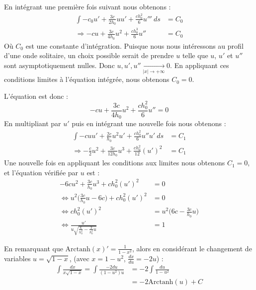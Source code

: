 \vspace{1em}

En intégrant une première fois suivant nous obtenons : 
\begin{equation*}
\begin{split}
    \int -c_0u' + \frac{3c}{2h_0}uu' + \frac{ch_0^2}{6}u''' \ ds &= C_0 \\
    \Rightarrow -cu + \frac{3c}{4h_0}u^2 + \frac{ch_0^3}{6}u'' &= C_0
\end{split}
\end{equation*}
Où $C_0$ est une constante d'intégration. 
Puisque nous nous intéressons au profil d'une onde solitaire, un choix possible serait de prendre $u$ telle que $u$, $u'$ et $u''$ sont asymptotiquement nulles. Donc $u,u',u'' \xrightarrow[|x| \to +\infty]{} 0$.
En appliquant ces conditions limites à l'équation intégrée, nous obtenons $C_0 = 0$.

L'équation est donc :
$$-cu + \frac{3c}{4h_0}u^2 + \frac{ch_0^2}{6}u'' = 0$$
En multipliant par $u'$ puis en intégrant une nouvelle fois nous obtenons :
\begin{equation*}
\begin{split}
    \int -cuu' + \frac{2c}{h_0}u^2u' + \frac{ch_0^2}{6}u''u' \ ds &= C_1 \\
    \Rightarrow -\frac{c}{2}u^2 + \frac{3c}{12h_0}u^3 + \frac{ch_0^2}{12}(u')^2 &= C_1
\end{split}
\end{equation*}
Une nouvelle fois en appliquant les conditions aux limites nous obtenons $C_1 = 0$, et l'équation vérifiée par $u$ est :
\begin{equation*}
\begin{split}
    -6c u^2 + \frac{3c}{h_0}u^3 + ch_0^2(u')^2 &= 0 \\
    \Leftrightarrow u^2\bigg(\frac{3c}{h_0}u -6c \bigg) + ch_0^2(u')^2 &= 0 \\
    \Leftrightarrow ch_0^2(u')^2 &= u^2\bigg(6c - \frac{3c}{h_0}u \bigg) \\
    \Leftrightarrow \frac{u'}{u\sqrt{\frac{6}{h_0^2} - \frac{3}{h_0^3}u}} &= 1
\end{split}
\end{equation*}

En remarquant que $\text{Arctanh}(x)' = \frac{1}{1 - x^2}$, alors en considérant le changement de variables $u = \sqrt{1 - x}$, (avec $x = 1 - u^2$, $\frac{dx}{du} = -2u$) \cite{soliton2} : 
\begin{equation*}
\begin{split}
    \int \frac{dx}{x\sqrt{1 - x}} = \int \frac{-2du}{(1 - u^2)u} &= -2 \int \frac{du}{1 - u^2} \\
    &= -2\text{Arctanh}(u) + C
\end{split}
\end{equation*}

